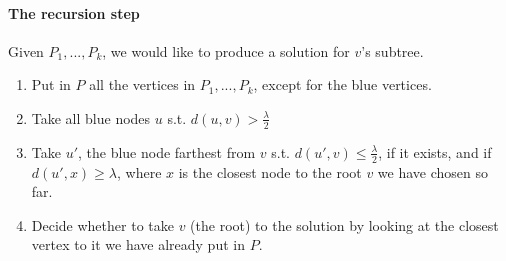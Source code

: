 \documentclass[11pt,a4paper]{article}
\theoremstyle{definition}
\theoremstyle{remark}
\begin{document}
\paragraph{The recursion step} Given $P_{1},...,P_{k}$, we would like to produce a solution for $v$'s subtree.
\begin{enumerate}
\item Put in $P$ all the vertices in $P_{1},...,P_{k}$, except for the blue vertices.
\item Take all blue nodes $u$ s.t. $d(u,v)> \frac{\lambda}{2}$
\item Take $u'$, the blue node farthest from $v$ s.t. $d(u',v)\leq \frac{\lambda}{2}$, if it exists, and if $d(u',x)\geq \lambda$, where $x$ is the closest node to the root $v$ we have chosen so far.
\item Decide whether to take $v$ (the root) to the solution by looking at the closest vertex to it we have already put in $P$.
\end{enumerate}
\end{document}
